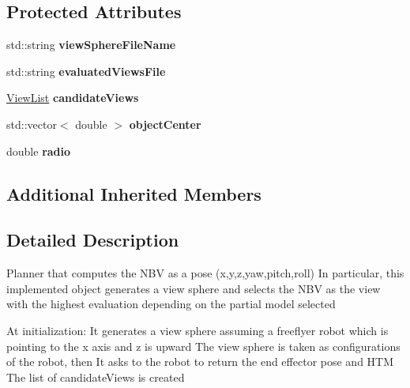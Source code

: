\subsection*{Protected Attributes}
\begin{DoxyCompactItemize}
\item 
std\+::string {\bfseries view\+Sphere\+File\+Name}\hypertarget{classWorkspaceNBVPlanner_aff8df8d09551a89635a5f39c2089ce29}{}\label{classWorkspaceNBVPlanner_aff8df8d09551a89635a5f39c2089ce29}

\item 
std\+::string {\bfseries evaluated\+Views\+File}\hypertarget{classWorkspaceNBVPlanner_a5dd5347db8708cbd72a2bc81d26de9d7}{}\label{classWorkspaceNBVPlanner_a5dd5347db8708cbd72a2bc81d26de9d7}

\item 
\hyperlink{classViewList}{View\+List} {\bfseries candidate\+Views}\hypertarget{classWorkspaceNBVPlanner_ad96bc939d0cb7cefa707d98f51de8e76}{}\label{classWorkspaceNBVPlanner_ad96bc939d0cb7cefa707d98f51de8e76}

\item 
std\+::vector$<$ double $>$ {\bfseries object\+Center}\hypertarget{classWorkspaceNBVPlanner_ad5372c462051e5757370d1fc4682a9e6}{}\label{classWorkspaceNBVPlanner_ad5372c462051e5757370d1fc4682a9e6}

\item 
double {\bfseries radio}\hypertarget{classWorkspaceNBVPlanner_a12a867beffb670bbb574967782727564}{}\label{classWorkspaceNBVPlanner_a12a867beffb670bbb574967782727564}

\end{DoxyCompactItemize}
\subsection*{Additional Inherited Members}


\subsection{Detailed Description}
Planner that computes the N\+BV as a pose (x,y,z,yaw,pitch,roll) In particular, this implemented object generates a view sphere and selects the N\+BV as the view with the highest evaluation depending on the partial model selected

At initialization\+: It generates a view sphere assuming a freeflyer robot which is pointing to the x axis and z is upward The view sphere is taken as configurations of the robot, then It asks to the robot to return the end effector pose and H\+TM The list of candidate\+Views is created


